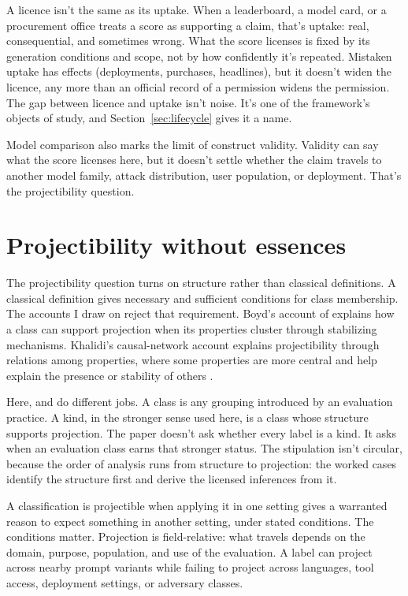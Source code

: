 \documentclass[12pt]{article}
\begin{document}
A licence isn't the same as its uptake. When a leaderboard, a model card, or a
procurement office treats a score as supporting a claim, that's uptake: real,
consequential, and sometimes wrong. What the score licenses is fixed by its
generation conditions and scope, not by how confidently it's repeated.
Mistaken uptake has effects (deployments, purchases, headlines), but it doesn't
widen the licence, any more than an official record of a permission widens the
permission. The gap between licence and uptake isn't noise. It's one of the
framework's objects of study, and Section~\ref{sec:lifecycle} gives it a name.

Model comparison also marks the limit of construct validity. Validity can
say what the score licenses here, but it doesn't settle whether the claim
travels to another model family, attack distribution, user population, or
deployment. That's the projectibility question.

\section{Projectibility without essences}\label{sec:projectibility}

The projectibility question turns on structure rather than classical
definitions. A classical definition gives necessary and sufficient conditions
for class membership. The accounts I draw on reject that requirement. Boyd's
account of  explains how a class can
support projection when its properties cluster through stabilizing mechanisms.
Khalidi's causal-network account explains projectibility through relations among
properties, where some properties are more central and help explain the presence
or stability of others \citep{boyd1991,boyd1999,khalidi2018causal}.

Here,  and  do different jobs. A class is any grouping
introduced by an evaluation practice. A kind, in the stronger sense used here,
is a class whose structure supports projection. The paper doesn't ask
whether every label is a kind. It asks when an evaluation class earns that
stronger status. The stipulation isn't circular, because the order of analysis
runs from structure to projection: the worked cases identify the structure
first and derive the licensed inferences from it.

A classification is projectible when applying it in one setting gives a
warranted reason to expect something in another setting, under stated
conditions. The conditions matter. Projection is field-relative: what travels
depends on the domain, purpose, population, and use of the evaluation. A label
can project across nearby prompt variants while failing to project across
languages, tool access, deployment settings, or adversary classes.
\end{document}
